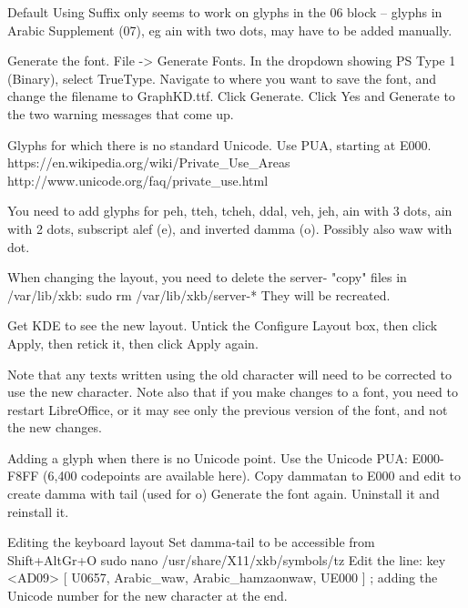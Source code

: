 Default Using Suffix only seems to work on glyphs in the 06 block -- glyphs in Arabic Supplement (07), eg ain with two dots, may have to be added manually.

Generate the font.
File -> Generate Fonts.
In the dropdown showing PS Type 1 (Binary), select TrueType.
Navigate to where you want to save the font, and change the filename to GraphKD.ttf.
Click Generate.
Click Yes and Generate to the two warning messages that come up.

Glyphs for which there is no standard Unicode.
Use PUA, starting at E000.
https://en.wikipedia.org/wiki/Private_Use_Areas
http://www.unicode.org/faq/private_use.html

You need to add glyphs for peh, tteh, tcheh, ddal, veh, jeh, ain with 3 dots, ain with 2 dots, subscript alef (e), and inverted damma (o).  Possibly also waw with dot.

When changing the layout, you need to delete the server- "copy" files in /var/lib/xkb:
sudo rm /var/lib/xkb/server-*
They will be recreated.

Get KDE to see the new layout.
Untick the Configure Layout box, then click Apply, then retick it, then click Apply again.

Note that any texts written using the old character will need to be corrected to use the new character.
Note also that if you make changes to a font, you need to restart LibreOffice, or it may see only the previous version of the font, and not the new changes.

Adding a glyph when there is no Unicode point.
Use the Unicode PUA: E000-F8FF (6,400 codepoints are available here).
Copy dammatan to E000 and edit to create damma with tail (used for o)
Generate the font again.
Uninstall it and reinstall it.

Editing the keyboard layout
Set damma-tail to be accessible from Shift+AltGr+O
sudo nano /usr/share/X11/xkb/symbols/tz
Edit the line:
key <AD09> { [          U0657,     Arabic_waw, Arabic_hamzaonwaw, UE000                 ] };
adding the Unicode number for the new character at the end.

